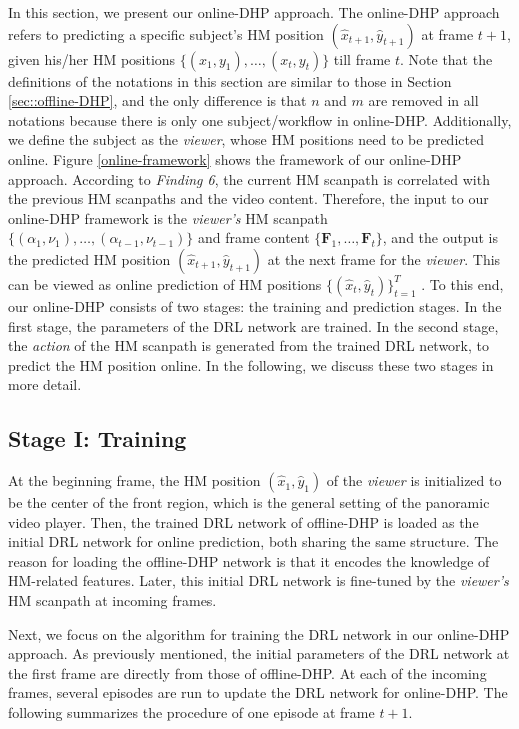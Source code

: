 \documentclass[10pt,journal,compsoc]{IEEEtran}
\begin{document}
In this section, we present our online-DHP approach.
The online-DHP approach refers to predicting a specific subject's HM position $(\hat{x}_{t+1},\hat{y}_{t+1})$ at frame $t+1$, given his/her HM positions $\{(x_{1},y_{1}),\ldots, (x_{t},y_{t})\}$ till frame $t$.
Note that the definitions of the notations in this section are similar to those in Section \ref{sec::offline-DHP}, and the only difference is that $n$ and $m$ are removed in all notations because there is only one subject/workflow in online-DHP.
Additionally, we define the subject as the \textit{viewer}, whose HM positions need to be predicted online. %
Figure \ref{online-framework} shows the framework of our online-DHP approach. %
According to \textit{Finding 6}, the current HM scanpath is correlated with the previous HM scanpaths and the video content.
Therefore, the input to our online-DHP framework is the \textit{viewer's} HM scanpath $\{(\alpha_1,\nu_1),\ldots, (\alpha_{t-1},\nu_{t-1})\}$ and frame content $\{\mathbf{F}_1, \ldots, \mathbf{F}_t \}$, and the output is the predicted HM position $(\hat{x}_{t+1},\hat{y}_{t+1})$ at the next frame for the \textit{viewer}.
This can be viewed as online prediction of HM positions $\{(\hat{x}_{t},\hat{y}_{t})\}_{t=1}^{T}$ .
To this end, our online-DHP consists of two stages: the training and prediction stages.
In the first stage, the parameters of the DRL network are trained.
In the second stage, the \textit{action} of the HM scanpath is generated from the trained DRL network, to predict the HM position online.
In the following, we discuss these two stages in more detail.

\subsection{Stage I: Training}
At the beginning frame, the HM position $(\hat{x}_1,\hat{y}_1)$ of the \textit{viewer} is initialized to be the center of the front region, which is the general setting of  the panoramic video player. Then, the trained DRL network of offline-DHP is loaded as the initial DRL network for online prediction, both sharing the same structure.
The reason for loading the offline-DHP network is that it encodes the knowledge of HM-related features.
Later, this initial DRL network is fine-tuned by the \textit{viewer's} HM scanpath at incoming frames.

Next, we focus on the algorithm for training the DRL network in our online-DHP approach. As previously mentioned, the initial parameters of the DRL network at the first frame are directly from those of offline-DHP. At each of the incoming frames, several episodes are run to update the DRL network for online-DHP. The following summarizes the procedure of one episode at frame $t+1$.
\end{document}

